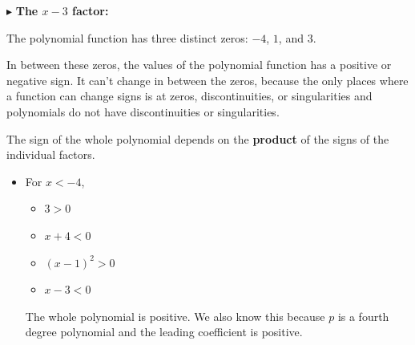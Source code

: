 \documentclass{ximera}
\begin{document}
\begin{example}
$\blacktriangleright$ \textbf{The $x-3$ factor:}

\begin{image}
  \end{image}


The polynomial function has three distinct zeros: $-4$, $1$, and $3$. 

In between these zeros, the values of the polynomial function has a positive or negative sign. It can't change in between the zeros, because the only places where a function can change signs is at zeros, discontinuities, or singularities and polynomials do not have discontinuities or singularities.

The sign of the whole polynomial depends on the \textbf{\textcolor{purple!85!blue}{product}} of the signs of the individual factors.



\begin{itemize}
\item For $x < -4$, 
\begin{itemize}
  \item $3 > 0$
  \item $x+4 < 0$
  \item $(x-1)^2 > 0$
  \item $x-3 < 0$ 
\end{itemize}
The whole polynomial is positive. We also know this because $p$ is a fourth degree polynomial and the leading coefficient is positive.



\end{itemize}
\end{example}
\end{document}
